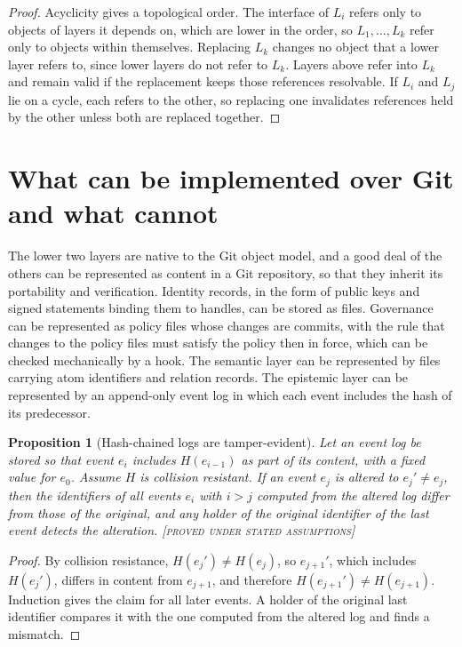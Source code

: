 \documentclass[11pt,twoside,openright]{book}
\theoremstyle{plain}
\newtheorem{proposition}[theorem]{Proposition}
\theoremstyle{definition}
\theoremstyle{remark}
\newcommand{\Proved}{\textup{\textsc{[proved under stated assumptions]}}}
\begin{document}
\begin{proof}
Acyclicity gives a topological order. The interface of $L_i$ refers only to objects of layers it depends on, which are lower in the order, so $L_1,\dots,L_k$ refer only to objects within themselves. Replacing $L_k$ changes no object that a lower layer refers to, since lower layers do not refer to $L_k$. Layers above refer into $L_k$ and remain valid if the replacement keeps those references resolvable. If $L_i$ and $L_j$ lie on a cycle, each refers to the other, so replacing one invalidates references held by the other unless both are replaced together.
\end{proof}

\section{What can be implemented over Git and what cannot}

The lower two layers are native to the Git object model, and a good deal of the others can be represented as content in a Git repository, so that they inherit its portability and verification. Identity records, in the form of public keys and signed statements binding them to handles, can be stored as files. Governance can be represented as policy files whose changes are commits, with the rule that changes to the policy files must satisfy the policy then in force, which can be checked mechanically by a hook. The semantic layer can be represented by files carrying atom identifiers and relation records. The epistemic layer can be represented by an append-only event log in which each event includes the hash of its predecessor.

\begin{proposition}[Hash-chained logs are tamper-evident]\label{prop:chain}
Let an event log be stored so that event $e_i$ includes $H(e_{i-1})$ as part of its content, with a fixed value for $e_0$. Assume $H$ is collision resistant. If an event $e_j$ is altered to $e_j'\ne e_j$, then the identifiers of all events $e_i$ with $i>j$ computed from the altered log differ from those of the original, and any holder of the original identifier of the last event detects the alteration.
\Proved{}
\end{proposition}

\begin{proof}
By collision resistance, $H(e_j')\neq H(e_j)$, so $e_{j+1}'$, which includes $H(e_j')$, differs in content from $e_{j+1}$, and therefore $H(e_{j+1}')\ne H(e_{j+1})$. Induction gives the claim for all later events. A holder of the original last identifier compares it with the one computed from the altered log and finds a mismatch.
\end{proof}
\end{document}
